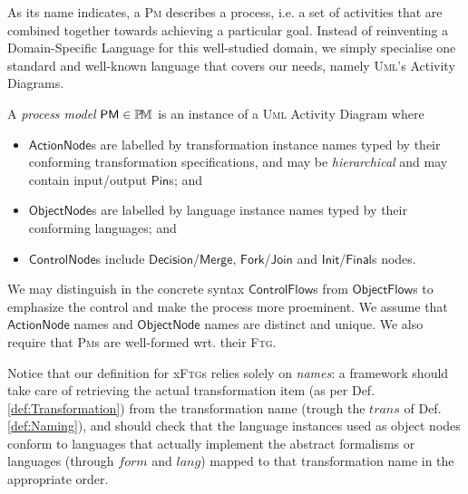 
\medskip
As its name indicates, a \textsc{Pm} describes a process, i.e. a set of 
activities that are combined together towards achieving a particular goal. 
Instead of reinventing a Domain-Specific Language for this well-studied domain, 
we simply specialise one standard and well-known language that covers our 
needs, namely \textsc{Uml}'s Activity Diagrams.


\begin{Definition}
   A \emph{process model} $\mathsf{PM}\in\mathbb{P}\!\mathbb{M}$ is an instance of a 
\textsc{Uml} Activity Diagram where 
\begin{itemize}
   \item $\mathsf{ActionNode}$s are labelled by transformation instance names 
typed by their conforming transformation specifications, and may be 
\emph{hierarchical} and may contain input/output $\mathsf{Pin}$s; and 
   \item $\mathsf{ObjectNode}$s are labelled by language instance names typed 
by their conforming languages; and 
   \item $\mathsf{ControlNode}$s include 
$\mathsf{Decision}$/$\mathsf{Merge}$, $\mathsf{Fork}$/$\mathsf{Join}$ and 
$\mathsf{Init}$/$\mathsf{Final}$s nodes.   
\end{itemize}
\end{Definition}
We may distinguish in the concrete syntax $\mathsf{ControlFlow}$s from 
$\mathsf{ObjectFlow}$s to emphasize the control and make the process more 
proeminent. We assume that $\mathsf{ActionNode}$ names and 
$\mathsf{ObjectNode}$ names are distinct and unique. We also require that 
\textsc{Pm}s are well-formed wrt. their \textsc{Ftg}.

Notice that our definition for x\textsc{Ftg}s  relies solely on \emph{names}: a 
framework should take care of retrieving the actual transformation item (as per 
Def. \ref{def:Transformation}) from the transformation name (trough 
the $trans$ of Def. \ref{def:Naming}), and should check that the language 
instances used as object nodes conform to languages that actually implement the 
abstract formalisms or languages (through $form$ and $lang$) mapped to that 
transformation name in the appropriate 
order.

